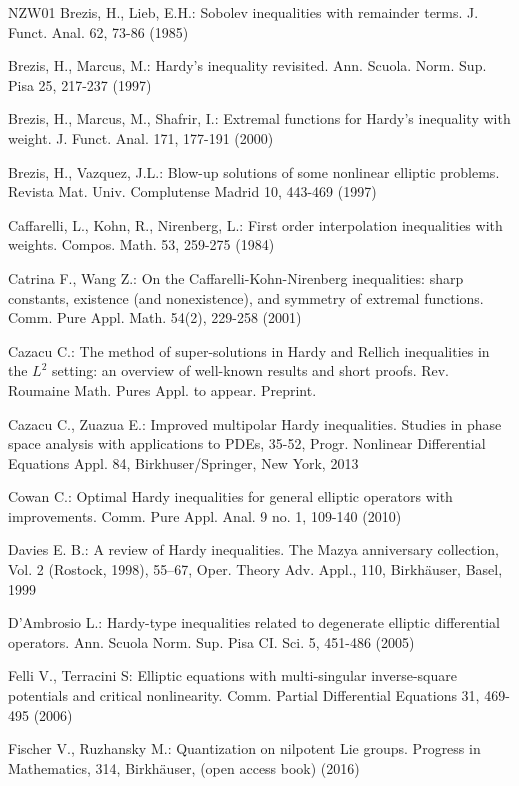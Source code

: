 \documentclass[a4paper,12pt,reqno]{amsart}
\theoremstyle{theorem}
\numberwithin{equation}{section}
\theoremstyle{plain}
\theoremstyle{definition}
\theoremstyle{defi}
\begin{document}
\begin{thebibliography}{NZW01}
Brezis, H., Lieb, E.H.: Sobolev inequalities with remainder terms. J. Funct. Anal. 62, 73-86 (1985)

Brezis, H., Marcus, M.: Hardy's inequality revisited. Ann. Scuola. Norm. Sup. Pisa 25, 217-237 (1997)

Brezis, H., Marcus, M., Shafrir, I.: Extremal functions for Hardy’s inequality with weight. J. Funct. Anal. 171, 177-191 (2000)

Brezis, H., Vazquez, J.L.: Blow-up solutions of some nonlinear elliptic problems. Revista Mat. Univ. Complutense Madrid 10, 443-469 (1997)


Caffarelli, L., Kohn, R., Nirenberg, L.: First order interpolation inequalities with weights. Compos. Math. 53, 259-275 (1984)

Catrina F., Wang Z.: On the Caffarelli-Kohn-Nirenberg inequalities: sharp constants, existence (and nonexistence), and symmetry of extremal functions. Comm. Pure Appl. Math. 54(2), 229-258 (2001)

Cazacu C.: The method of super-solutions in Hardy and Rellich inequalities in the $L^2$ setting: an overview of well-known results and short proofs.  Rev. Roumaine Math. Pures Appl. to appear. Preprint.

Cazacu C., Zuazua E.: Improved multipolar Hardy inequalities. Studies in phase space analysis with applications to PDEs, 35-52, Progr. Nonlinear Differential Equations Appl. 84, Birkhuser/Springer, New York, 2013

Cowan C.: Optimal Hardy inequalities for general elliptic operators with improvements. Comm. Pure Appl. Anal. 9 no. 1, 109-140 (2010)

 Davies E. B.: A review of Hardy inequalities. The Mazya anniversary collection, Vol. 2 (Rostock, 1998), 55–67, Oper. Theory Adv. Appl., 110, Birkh\"auser, Basel, 1999

D'Ambrosio L.: Hardy-type inequalities related to degenerate elliptic differential operators. Ann. Scuola Norm. Sup. Pisa CI. Sci. 5, 451-486 (2005) 
	

Felli V., Terracini S: Elliptic equations with multi-singular inverse-square potentials and critical nonlinearity. Comm. Partial Differential Equations 31, 469-495 (2006)

Fischer V., Ruzhansky M.:
\newblock Quantization on nilpotent Lie groups.
{Progress in Mathematics},  314, Birkh\"auser, (open access book) (2016)


\end{thebibliography}
\end{document}
